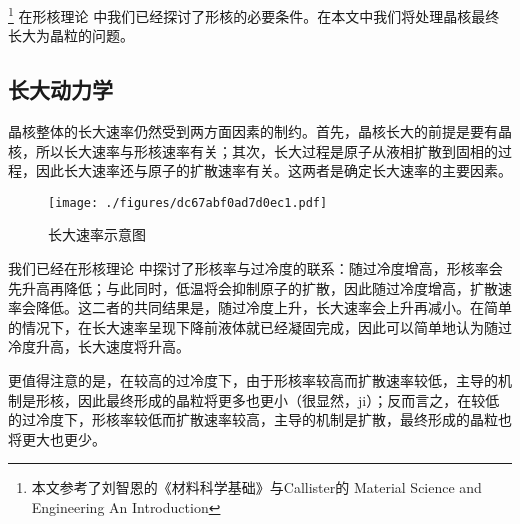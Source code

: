 
\footnote{本文参考了刘智恩的《材料科学基础》与Callister的 Material Science and Engineering An Introduction} 在形核理论  中我们已经探讨了形核的必要条件。在本文中我们将处理晶核最终长大为晶粒的问题。

\subsection{长大动力学}
晶核整体的长大速率仍然受到两方面因素的制约。首先，晶核长大的前提是要有晶核，所以长大速率与形核速率有关；其次，长大过程是原子从液相扩散到固相的过程，因此长大速率还与原子的扩散速率有关。这两者是确定长大速率的主要因素。
\begin{figure}[ht]
\centering
\texttt{[image: ./figures/dc67abf0ad7d0ec1.pdf]}
\caption{长大速率示意图} \label{fig_GGRW_1}
\end{figure}

我们已经在形核理论  中探讨了形核率与过冷度的联系：随过冷度增高，形核率会先升高再降低；与此同时，低温将会抑制原子的扩散，因此随过冷度增高，扩散速率会降低。这二者的共同结果是，随过冷度上升，长大速率会上升再减小。在简单的情况下，在长大速率呈现下降前液体就已经凝固完成，因此可以简单地认为随过冷度升高，长大速度将升高。

更值得注意的是，在较高的过冷度下，由于形核率较高而扩散速率较低，主导的机制是形核，因此最终形成的晶粒将更多也更小（很显然，ji）；反而言之，在较低的过冷度下，形核率较低而扩散速率较高，主导的机制是扩散，最终形成的晶粒也将更大也更少。